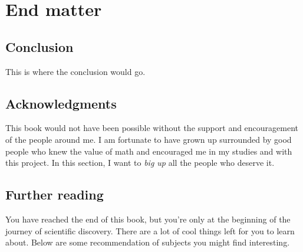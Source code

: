 
%
%

\chapter{End matter}
\label{chaptxer:end_matter}


\section*{Conclusion}
\label{sec:conclusion}

	This is where the conclusion would go.


\section*{Acknowledgments}
\label{sec:acknowledgments}
	
	This book would not have been possible without the support and encouragement of the people around me.
	I am fortunate to have grown up surrounded by good people who knew the value of math
	and encouraged me in my studies and with this project.
	In this section, I want to \emph{big up} all the people who deserve it.


\section*{Further reading}
\label{sec:further_reading}

	You have reached the end of this book,
	but you're only at the beginning of the journey of scientific discovery.
	There are a lot of cool things left for you to learn about.
	Below are some recommendation of subjects you might find interesting.
